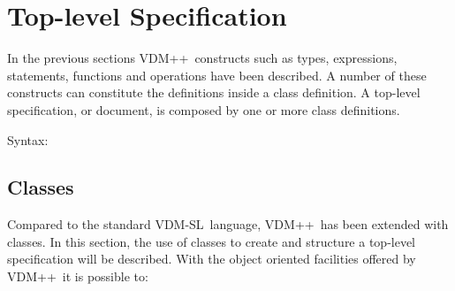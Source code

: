 \documentclass[\pformat,12pt]{article}
\newcommand{\vdmsl}{VDM-SL}
\newcommand{\vdmpp}{VDM++}
\begin{document}
%
%


%

\newpage
\section{Top-level Specification}

In the previous sections \vdmpp\ constructs such as types,
expressions, statements, functions and operations have been
described. A number of these constructs can constitute the definitions
inside a class definition. A top-level specification, or document, is
composed by one or more class definitions.

\begin{description}
\item[Syntax:]
\end{description}


\subsection{Classes}
\label{sec:classdep}

Compared to the standard \vdmsl\ language,  \vdmpp\ has been
extended with classes. In this section, the use of classes to create
and structure a top-level specification will be described. With the
object oriented facilities offered by \vdmpp\ it is possible to:
\end{document}
